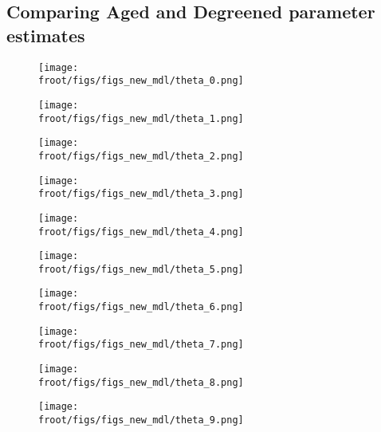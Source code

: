 \subsection{Comparing Aged and Degreened parameter estimates}

\begin{figure}[H]
        \begin{minipage}{0.33\textwidth}
                \texttt{[image: \\froot/figs/figs\_new\_mdl/theta\_0.png]}
        \end{minipage}
        \begin{minipage}{0.33\textwidth}
                \texttt{[image: \\froot/figs/figs\_new\_mdl/theta\_1.png]}
        \end{minipage}
        \begin{minipage}{0.33\textwidth}
                \texttt{[image: \\froot/figs/figs\_new\_mdl/theta\_2.png]}
        \end{minipage}
\end{figure}

\begin{figure}[H]
        \begin{minipage}{0.33\textwidth}
                \texttt{[image: \\froot/figs/figs\_new\_mdl/theta\_3.png]}
        \end{minipage}
        \begin{minipage}{0.33\textwidth}
                \texttt{[image: \\froot/figs/figs\_new\_mdl/theta\_4.png]}
        \end{minipage}
        \begin{minipage}{0.33\textwidth}
                \texttt{[image: \\froot/figs/figs\_new\_mdl/theta\_5.png]}
        \end{minipage}
\end{figure}

\begin{figure}[H]
        \begin{minipage}{0.33\textwidth}
                \texttt{[image: \\froot/figs/figs\_new\_mdl/theta\_6.png]}
        \end{minipage}
        \begin{minipage}{0.33\textwidth}
                \texttt{[image: \\froot/figs/figs\_new\_mdl/theta\_7.png]}
        \end{minipage}
        \begin{minipage}{0.33\textwidth}
                \texttt{[image: \\froot/figs/figs\_new\_mdl/theta\_8.png]}
        \end{minipage}
\end{figure}

\begin{figure}[H]
        \centering
        \texttt{[image: \\froot/figs/figs\_new\_mdl/theta\_9.png]}
\end{figure}
